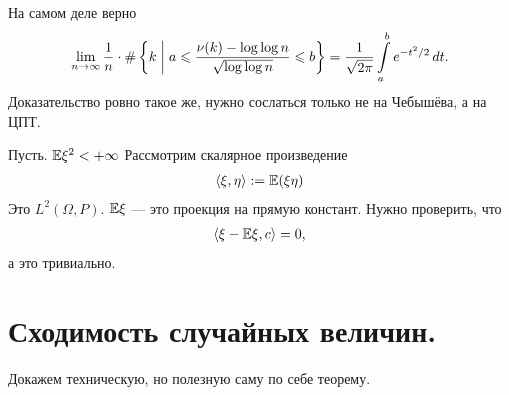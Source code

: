 \documentclass[../main.tex]{subfiles}
\begin{document}
\begin{remrk}
 На самом деле верно
 \begin{align*}
  \lim_{n \to \infty} \frac{1}{n} \cdot \# \left\{ k \;\middle|\; a \leqslant \frac{\nu(k)- \log\log n}{\sqrt{\log \log n}} \leqslant b \right\} = \frac{1}{\sqrt{2\pi}} \int\limits_{a}^{b} e^{-t^{2} / 2}\,dt.
 \end{align*} Доказательство ровно такое же, нужно сослаться только не на Чебышёва, а на ЦПТ.
\end{remrk}

\begin{remrk*}
 Пусть. $ \mathbb E\xi^{2} < +\infty $ Рассмотрим скалярное произведение
 \begin{align*}
  \left\langle \xi,\eta \right\rangle := \mathbb E(\xi\eta)
 \end{align*} Это $ L^{2}(\Omega, P) $. $\mathbb E\xi$ --- это проекция на прямую констант. Нужно проверить, что
 \begin{align*}
  \left\langle \xi - \mathbb E\xi, c \right\rangle = 0,
 \end{align*} а это тривиально.
\end{remrk*}

\section{Сходимость случайных величин.}

Докажем техническую, но полезную саму по себе теорему.
\end{document}

